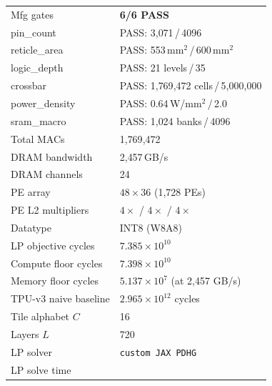 \begin{table}[h]
\begin{tabular}{@{}ll@{}}
\midrule
Mfg gates               & \textcolor{green!60!black}{\textbf{6/6 PASS}} \\
\quad pin\_count         & PASS: 3{,}071\,/\,4096 \\
\quad reticle\_area      & PASS: 553\,mm$^2$\,/\,600\,mm$^2$ \\
\quad logic\_depth       & PASS: 21 levels\,/\,35 \\
\quad crossbar           & PASS: 1{,}769{,}472 cells\,/\,5{,}000{,}000 \\
\quad power\_density     & PASS: 0.64\,W/mm$^2$\,/\,2.0 \\
\quad sram\_macro        & PASS: 1{,}024 banks\,/\,4096 \\
\midrule
Total MACs              & 1{,}769{,}472 \\
DRAM bandwidth          & 2{,}457\,GB/s \\
DRAM channels           & 24 \\
PE array                & $48 \times 36$ (1{,}728 PEs) \\
PE L2 multipliers       & $4\times$ / $4\times$ / $4\times$ \\
Datatype                & INT8 (W8A8) \\
LP objective cycles     & $7.385 \times 10^{10}$ \\
Compute floor cycles    & $7.398 \times 10^{10}$ \\
Memory floor cycles     & $5.137 \times 10^{7}$ (at 2{,}457 GB/s) \\
TPU-v3 naive baseline   & $2.965 \times 10^{12}$ cycles \\
Tile alphabet $C$       & 16 \\
Layers $L$              & 720 \\
LP solver               & \texttt{custom JAX PDHG} \\
LP solve time           &  \\
\bottomrule
\end{tabular}
\end{table}


